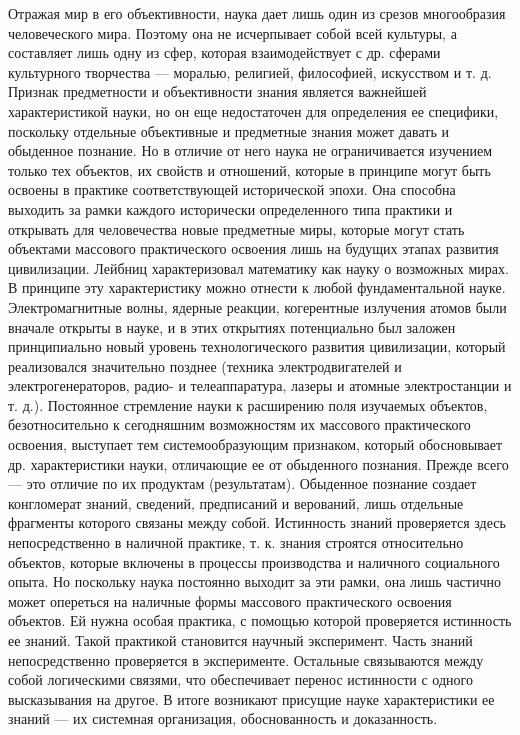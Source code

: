 \documentclass[a4paper,12pt]{article}
\begin{document}
    Отражая мир в его объективности, наука дает лишь один из срезов многообразия человеческого мира. Поэтому она не исчерпывает собой всей культуры, а составляет лишь одну из сфер, которая взаимодействует с др. сферами культурного творчества — моралью, религией, философией, искусством и т. д. Признак предметности и объективности знания является важнейшей характеристикой науки, но он еще недостаточен для определения ее специфики, поскольку отдельные объективные и предметные знания может давать и обыденное познание. Но в отличие от него наука не ограничивается изучением только тех объектов, их свойств и отношений, которые в принципе могут быть освоены в практике соответствующей исторической эпохи. Она способна выходить за рамки каждого исторически определенного типа практики и открывать для человечества новые предметные миры, которые могут стать объектами массового практического освоения лишь на будущих этапах развития цивилизации. Лейбниц характеризовал математику как науку о возможных мирах. В принципе эту характеристику можно отнести к любой фундаментальной науке. Электромагнитные волны, ядерные реакции, когерентные излучения атомов были вначале открыты в науке, и в этих открытиях потенциально был заложен принципиально новый уровень технологического развития цивилизации, который реализовался значительно позднее (техника электродвигателей и электрогенераторов, радио- и телеаппаратура, лазеры и атомные электростанции и т. д.). Постоянное стремление науки к расширению поля изучаемых объектов, безотносительно к сегодняшним возможностям их массового практического освоения, выступает тем системообразующим признаком, который обосновывает др. характеристики науки, отличающие ее от обыденного познания. Прежде всего — это отличие по их продуктам (результатам). Обыденное познание создает конгломерат знаний, сведений, предписаний и верований, лишь отдельные фрагменты которого связаны между собой. Истинность знаний проверяется здесь непосредственно в наличной практике, т. к. знания строятся относительно объектов, которые включены в процессы производства и наличного социального опыта. Но поскольку наука постоянно выходит за эти рамки, она лишь частично может опереться на наличные формы массового практического освоения объектов. Ей нужна особая практика, с помощью которой проверяется истинность ее знаний. Такой практикой становится научный эксперимент. Часть знаний непосредственно проверяется в эксперименте. Остальные связываются между собой логическими связями, что обеспечивает перенос истинности с одного высказывания на другое. В итоге возникают присущие науке характеристики ее знаний — их системная организация, обоснованность и доказанность.
\end{document}
